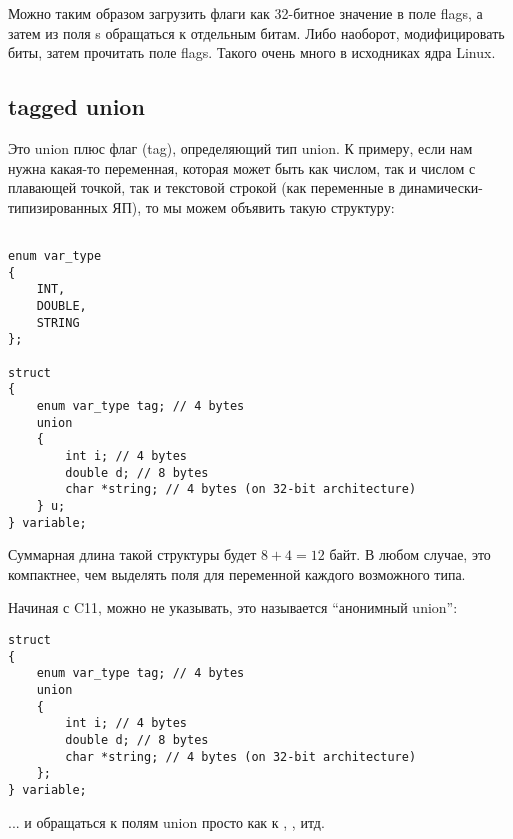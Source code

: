 Можно таким образом загрузить флаги как 32-битное значение в поле flags, а затем из поля s обращаться
к отдельным битам. Либо наоборот, модифицировать биты, затем прочитать поле flags. Такого очень много
в исходниках ядра Linux.

\subsection{tagged union}

Это union плюс флаг (tag), определяющий тип union. К примеру, если нам нужна какая-то переменная,
которая может быть как числом, так и числом с плавающей точкой, так и текстовой строкой (как переменные
в динамически-типизированных ЯП), то мы можем объявить такую структуру:

\begin{lstlisting}

enum var_type
{
	INT,
	DOUBLE,
	STRING
};

struct
{
	enum var_type tag; // 4 bytes
	union
	{
		int i; // 4 bytes
		double d; // 8 bytes
		char *string; // 4 bytes (on 32-bit architecture)
	} u;
} variable;
\end{lstlisting}

Суммарная длина такой структуры будет $8+4=12$ байт. В любом случае, это компактнее, чем выделять
поля для переменной каждого возможного типа.

Начиная с C11\cite{C11},  можно не указывать, это называется ``анонимный union'':

\begin{lstlisting}
struct
{
	enum var_type tag; // 4 bytes
	union
	{
		int i; // 4 bytes
		double d; // 8 bytes
		char *string; // 4 bytes (on 32-bit architecture)
	};
} variable;
\end{lstlisting}

... и обращаться к полям union просто как к , , итд.

